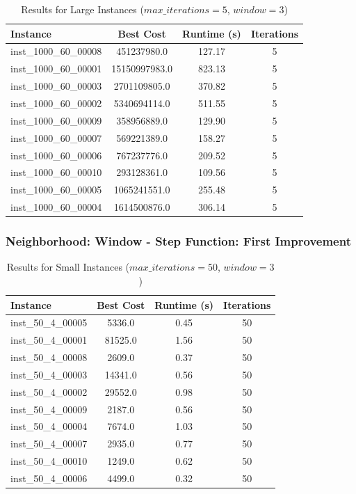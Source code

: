 \documentclass{article}
\begin{document}
\begin{table}[H]
\centering
\caption{Results for Large Instances ($max\_iterations=5$, $window=3$)}
\begin{tabular}{lccc}
\toprule
\textbf{Instance} & \textbf{Best Cost} & \textbf{Runtime (s)} & \textbf{Iterations} \\
\midrule
inst\_1000\_60\_00008 & 451237980.0   & 127.17 & 5 \\
inst\_1000\_60\_00001 & 15150997983.0 & 823.13 & 5 \\
inst\_1000\_60\_00003 & 2701109805.0  & 370.82 & 5 \\
inst\_1000\_60\_00002 & 5340694114.0  & 511.55 & 5 \\
inst\_1000\_60\_00009 & 358956889.0   & 129.90 & 5 \\
inst\_1000\_60\_00007 & 569221389.0   & 158.27 & 5 \\
inst\_1000\_60\_00006 & 767237776.0   & 209.52 & 5 \\
inst\_1000\_60\_00010 & 293128361.0   & 109.56 & 5 \\
inst\_1000\_60\_00005 & 1065241551.0  & 255.48 & 5 \\
inst\_1000\_60\_00004 & 1614500876.0  & 306.14 & 5 \\
\bottomrule
\end{tabular}
\label{tab:results_1000_60}
\end{table}


\subsubsection*{Neighborhood: Window - Step Function: First Improvement}

\begin{table}[H]
\centering
\caption{Results for Small Instances ($max\_iterations = 50$, $window=3$)}
\begin{tabular}{lccc}
\toprule
\textbf{Instance} & \textbf{Best Cost} & \textbf{Runtime (s)} & \textbf{Iterations} \\
\midrule
inst\_50\_4\_00005 & 5336.0   & 0.45  & 50 \\
inst\_50\_4\_00001 & 81525.0  & 1.56  & 50 \\
inst\_50\_4\_00008 & 2609.0   & 0.37  & 50 \\
inst\_50\_4\_00003 & 14341.0  & 0.56  & 50 \\
inst\_50\_4\_00002 & 29552.0  & 0.98  & 50 \\
inst\_50\_4\_00009 & 2187.0   & 0.56  & 50 \\
inst\_50\_4\_00004 & 7674.0   & 1.03  & 50 \\
inst\_50\_4\_00007 & 2935.0   & 0.77  & 50 \\
inst\_50\_4\_00010 & 1249.0   & 0.62  & 50 \\
inst\_50\_4\_00006 & 4499.0   & 0.32  & 50 \\
\bottomrule
\end{tabular}
\label{tab:results_50_4}
\end{table}
\end{document}
